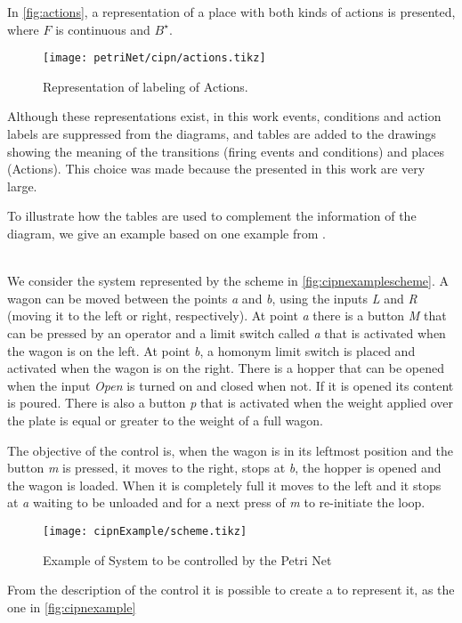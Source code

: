 In \autoref{fig:actions}, a representation of a place with both kinds of actions
is presented, where $F$ is continuous and $B^\star$.
\begin{figure}[H]
  \centering \texttt{[image: petriNet/cipn/actions.tikz]}
  \caption{Representation of labeling of Actions.}
  \label{fig:actions}
\end{figure}

Although these representations exist, in this work events, conditions and
action labels are suppressed from the diagrams, and tables are added to the drawings
showing the meaning of the transitions (firing events and conditions) and places
(Actions). This choice was made because the \CIPNs{}
presented in this work are very
large.

To illustrate how the tables are used to complement the information of the diagram, we give an example based on one example from \cite{david1989grafcet}.
\begin{example} ~\\
  \label{ex:loadingOfAWagon}
We consider the system represented by the scheme in
\autoref{fig:cipnexamplescheme}. A wagon can be moved between the points \emph{a} and
\emph{b}, using the inputs \emph{L} and \emph{R} (moving it to the left or right,
respectively). At point \emph{a} there is a button \emph{M} that can be pressed by an
operator and a limit switch called \emph{a} that is activated when the wagon is on
the left. At point \emph{b}, a homonym limit switch is placed and activated when the
wagon is on the right. There is a hopper that can
be opened when the input \emph{Open} is turned on and closed when not. If it is opened
its content is poured. There is also a
button \emph{p} that is activated when the weight applied over the plate is equal or
greater to the weight of a full wagon. 

The objective of the control is, when the wagon is in its leftmost position and
the button \emph{m} is pressed, it moves to the right, stops at \emph{b}, the hopper is
opened and the wagon is loaded. When it is completely full it moves to the left
and it stops at \emph{a} waiting to be unloaded and for a next press of \emph{m} to re-initiate
the loop. 
\end{example}


\begin{figure}[H]
  \centering \texttt{[image: cipnExample/scheme.tikz]}
  \caption{Example of System to be controlled by the Petri Net}
  \label{fig:cipnexamplescheme}
\end{figure}
From the description of the control it is possible to create a \CIPN{} to represent it, as the one in \autoref{fig:cipnexample}


